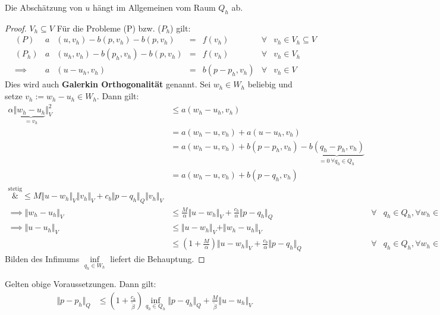 \begin{bemerkung}
	Die Abschätzung von $u$ hängt im Allgemeinen vom Raum $Q_h$ ab.
\end{bemerkung}

\begin{proof}
	$V_h\subseteq V$
	Für die Probleme (P) bzw. ($P_h$) gilt:
	\begin{align*}
		&(P) &a&(u,v_h)-b(p,v_h)-b(p,v_h)&=&f(v_h) &\forall&v_h\in V_h\subseteq V\\
		&(P_h) &a&(u_h,v_h)-b(p_h,v_h)-b(p,v_h)&=&f(v_h) &\forall&v_h\in V_h\\
		&\implies
		&a&(u-u_h,v_h)&=&b(p-p_h,v_h) &\forall&v_h\in V
	\end{align*}
	Dies wird auch \textbf{Galerkin Orthogonalität} genannt.
	Sei $w_h\in W_h$ beliebig und setze $v_h:=w_h-u_h\in W_h$.
	Dann gilt:
	\begin{align*}
		\alpha\Vert\underbrace{w_h-u_h}_{=v_h}\Vert_V^2
		&\leq a(w_h-u_h,v_h)\\
		&=a(w_h-u,v_h)+a(u-u_h,v_h)\\
		&=a(w_h-u,v_h)+b(p-p_h,v_h)-\underbrace{b(q_h-p_h,v_h)}_{=0~\forall q_h\in Q_h}\\
		&=a(w_h-u,v_h)+b(p-q_h,v_h)\\
		\overset{\text{stetig}}&\leq 
		M\Vert u-w_h\Vert_V\Vert v_h\Vert_V+c_b\Vert p-q_h\Vert_Q\Vert v_h\Vert_V\\
		\implies
		\Vert w_h-u_h\Vert_V
		&\leq \frac{M}{\alpha}\Vert u-w_h\Vert_V+\frac{c_b}{\alpha}\Vert p-q_h\Vert_Q &\forall& q_h\in Q_h,\forall w_h\in W_h\\
		\implies
		\Vert u-u_h\Vert_V
		&\leq\Vert u-w_h\Vert_V+\Vert w_h-u_h\Vert_V\\
		&\leq\left(1+\frac{M}{\alpha}\right)\Vert u-w_h\Vert_V+\frac{c_b}{\alpha}\Vert p-q_h\Vert_Q &\forall& q_h\in Q_h,\forall w_h\in W_h
	\end{align*}
	Bilden des Infimums $\inf\limits_{q_h\in W_h}$ liefert die Behauptung.
\end{proof}

\begin{theorem}
	Gelten obige Voraussetzungen. Dann gilt:
	\begin{align*}
		\Vert p-p_h\Vert_Q&\leq\left(1+\frac{c_b}{\tilde{\beta}}\right)\inf\limits_{q_h\in Q_h}\Vert p-q_h\Vert_Q+\frac{M}{\tilde{\beta}}\Vert u-u_h\Vert_V
	\end{align*}
\end{theorem}

